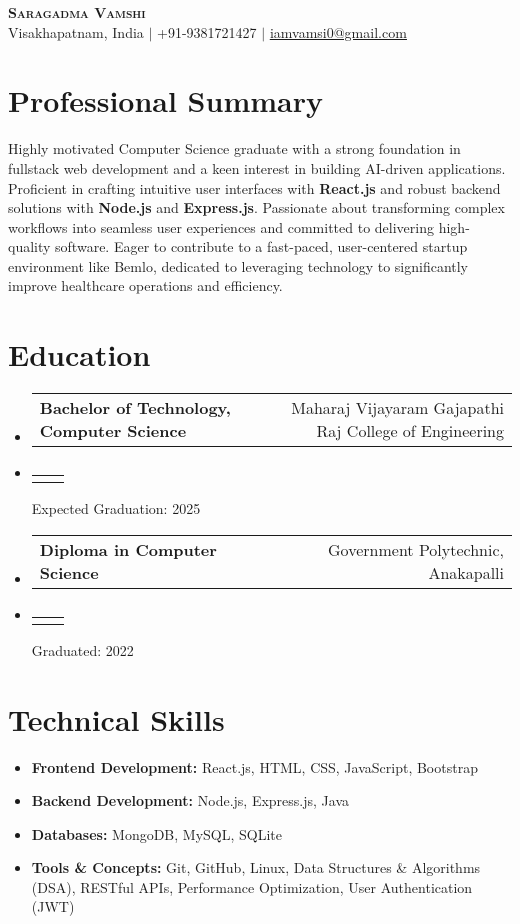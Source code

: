 \documentclass[11pt]{article}
\makeatletter
\newcommand{\resumeSubheading}[2]{
    \item
    \begin{tabular*}{0.97\textwidth}[t]{l@{\extracolsep{\fill}}r}
        \textbf{#1} & #2 \\
    \end{tabular*}
}
\newcommand{\resumeSubSubheading}[2]{
    \item
    \begin{tabular*}{0.97\textwidth}[t]{l@{\extracolsep{\fill}}r}
        \textit{#1} & \textit{#2} \\
    \end{tabular*}
}
\newcommand{\resumeItem}[1]{\item\small{#1}}
\newcommand{\resumeSubHeadingListStart}{\begin{itemize}[leftmargin=0.15in, label={}]}
\newcommand{\resumeSubHeadingListEnd}{\end{itemize}}
\makeatother
\begin{document}
\begin{center}
    \textbf{\Huge \scshape Saragadma Vamshi} \\ \vspace{2pt}
    \small Visakhapatnam, India $|$ +91-9381721427 $|$ \href{mailto:iamvamsi0@gmail.com}{\underline{iamvamsi0@gmail.com}}
\end{center}

\section*{Professional Summary}
\small
Highly motivated Computer Science graduate with a strong foundation in fullstack web development and a keen interest in building AI-driven applications. Proficient in crafting intuitive user interfaces with \textbf{React.js} and robust backend solutions with \textbf{Node.js} and \textbf{Express.js}. Passionate about transforming complex workflows into seamless user experiences and committed to delivering high-quality software. Eager to contribute to a fast-paced, user-centered startup environment like Bemlo, dedicated to leveraging technology to significantly improve healthcare operations and efficiency.

\section*{Education}
\resumeSubHeadingListStart
    \resumeSubheading
        {Bachelor of Technology, Computer Science}{Maharaj Vijayaram Gajapathi Raj College of Engineering}
        \resumeSubSubheading{}{} %
        {Expected Graduation: 2025}{}
    \resumeSubheading
        {Diploma in Computer Science}{Government Polytechnic, Anakapalli}
        \resumeSubSubheading{}{} %
        {Graduated: 2022}{}
\resumeSubHeadingListEnd

\section*{Technical Skills}
\resumeSubHeadingListStart
    \resumeItem{\textbf{Frontend Development:} React.js, HTML, CSS, JavaScript, Bootstrap}
    \resumeItem{\textbf{Backend Development:} Node.js, Express.js, Java}
    \resumeItem{\textbf{Databases:} MongoDB, MySQL, SQLite}
    \resumeItem{\textbf{Tools \& Concepts:} Git, GitHub, Linux, Data Structures \& Algorithms (DSA), RESTful APIs, Performance Optimization, User Authentication (JWT)}
\resumeSubHeadingListEnd
\end{document}

